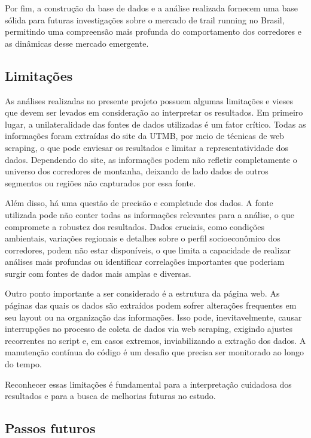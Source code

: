 Por fim, a construção da base de dados e a análise realizada fornecem uma base sólida para futuras investigações sobre o mercado de trail running no Brasil, permitindo uma compreensão mais profunda do comportamento dos corredores e as dinâmicas desse mercado emergente.

\subsection{Limitações}

As análises realizadas no presente projeto possuem algumas limitações e vieses que devem ser levados em consideração ao interpretar os resultados. Em primeiro lugar, a unilateralidade das fontes de dados utilizadas é um fator crítico. Todas as informações foram extraídas do site da UTMB, por meio de técnicas de web scraping, o que pode enviesar os resultados e limitar a representatividade dos dados. Dependendo do site, as informações podem não refletir completamente o universo dos corredores de montanha, deixando de lado dados de outros segmentos ou regiões não capturados por essa fonte.

Além disso, há uma questão de precisão e completude dos dados. A fonte utilizada pode não conter todas as informações relevantes para a análise, o que compromete a robustez dos resultados. Dados cruciais, como condições ambientais, variações regionais e detalhes sobre o perfil socioeconômico dos corredores, podem não estar disponíveis, o que limita a capacidade de realizar análises mais profundas ou identificar correlações importantes que poderiam surgir com fontes de dados mais amplas e diversas.

Outro ponto importante a ser considerado é a estrutura da página web. As páginas das quais os dados são extraídos podem sofrer alterações frequentes em seu layout ou na organização das informações. Isso pode, inevitavelmente, causar interrupções no processo de coleta de dados via web scraping, exigindo ajustes recorrentes no script e, em casos extremos, inviabilizando a extração dos dados. A manutenção contínua do código é um desafio que precisa ser monitorado ao longo do tempo.

Reconhecer essas limitações é fundamental para a interpretação cuidadosa dos resultados e para a busca de melhorias futuras no estudo.

\subsection{Passos futuros}

